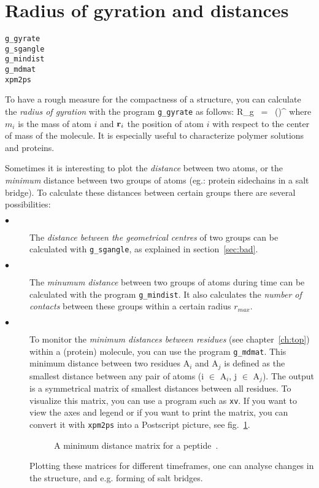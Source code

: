 \section{Radius of gyration and distances}
\label{sec:rg}
\begin{verbatim}
g_gyrate
g_sgangle
g_mindist
g_mdmat
xpm2ps
\end{verbatim}
To have a rough measure for the compactness of a structure, you can calculate 
the {\em radius of gyration} with the program {\tt g\_gyrate} as follows:
\beq
R_g ~=~ \left({}\right)^{\half}
\label{eq:rg}
\eeq
where $m_i$ is the mass of atom $i$ and ${\bf r}_i$ the position of 
atom $i$ with respect to the center of mass of the molecule. It is especially 
useful to characterize polymer solutions and proteins.

Sometimes it is interesting to plot the {\em distance} between two atoms,
or the {\em minimum} distance between two groups of atoms
(eg.: protein sidechains in a salt bridge). 
To calculate these distances between certain groups there are several 
possibilities:
\begin{description}
\item[$\bullet$] 
The {\em distance between the geometrical centres} of two groups can be 
calculated with {\tt g\_sgangle}, as explained in section~\ref{sec:bad}. 
\item[$\bullet$] 
The {\em minumum distance} between two groups of atoms during time 
can be calculated with the program {\tt g\_mindist}. It also calculates the 
{\em number of contacts} between these groups 
within a certain radius $r_{max}$.
\item[$\bullet$] 
To monitor the {\em minimum distances between residues} 
(see chapter~\ref{ch:top}) within a (protein) molecule, you can use 
the program {\tt g\_mdmat}. This minimum distance between two residues
A$_i$ and A$_j$ is defined as the smallest distance between any pair of 
atoms (i $\in$ A$_i$, j $\in$ A$_j$).
The output is a symmetrical matrix of smallest distances 
between all residues.
To visualize this matrix, you can use a program such as {\tt xv}.
If you want to view the axes and legend or if you want to print
the matrix, you can convert it with 
{\tt xpm2ps} into a Postscript picture, see fig.~\ref{fig:mdmat}.
%
\begin{figure}
\centerline{
}
\caption{A minimum distance matrix for a peptide~\protect\cite{Spoel96b}.}
\label{fig:mdmat}
\end{figure}
%
Plotting these matrices for different timeframes, one can analyse changes 
in the structure, and e.g. forming of salt bridges.
\end{description}
%
%
